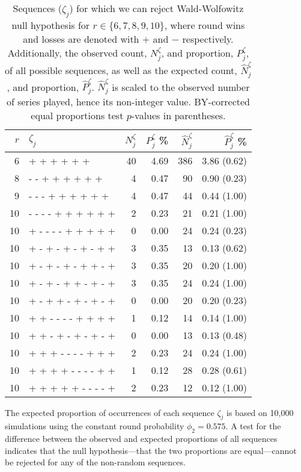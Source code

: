 \documentclass{article}
\begin{document}
\begin{table}

\caption{Sequences ($\zeta_j$) for which we can reject Wald-Wolfowitz null hypothesis for $r \in \{6, 7, 8, 9, 10\}$, where round wins and losses are denoted with $+$ and $-$ respectively. Additionally, the observed count, $N^{\zeta}_j$, and proportion, $P^{\zeta}_j$, of all possible sequences, as well as the expected count, $\hat{N}^{\zeta}_j$, and proportion, $\hat{P}^{\zeta}_j$. $\hat{N}^{\zeta}_j$ is scaled to the observed number of series played, hence its non-integer value. BY-corrected equal proportions test $p$-values in parentheses.}

\centering
\begin{tabular}{rlrrrr}
\toprule
$r$ & $\zeta_j$ & $N^{\zeta}_j$ & $P^{\zeta}_j$ \% & $\hat{N}^{\zeta}_j$ & $\hat{P}^{\zeta}_j$ \% \\ 
\midrule

6 & + + + + + + & 40 & 4.69 & 386 & 3.86 (0.62) \\ 
8 & - - + + + + + + & 4 & 0.47 & 90 & 0.90 (0.23) \\ 
9 & - - - + + + + + + & 4 & 0.47 & 44 & 0.44 (1.00) \\ 
10 & - - - - + + + + + + & 2 & 0.23 & 21 & 0.21 (1.00) \\ 
10 & + - - - - + + + + + & 0 & 0.00 & 24 & 0.24 (0.23) \\ 
10 & + - + - + - + - + + & 3 & 0.35 & 13 & 0.13 (0.62) \\ 
10 & + - + - + - + + - + & 3 & 0.35 & 20 & 0.20 (1.00) \\ 
10 & + - + - + + - + - + & 3 & 0.35 & 24 & 0.24 (1.00) \\ 
10 & + - + + - + - + - + & 0 & 0.00 & 20 & 0.20 (0.23) \\ 
10 & + + - - - - + + + + & 1 & 0.12 & 14 & 0.14 (1.00) \\ 
10 & + + - + - + - + - + & 0 & 0.00 & 13 & 0.13 (0.48) \\ 
10 & + + + - - - - + + + & 2 & 0.23 & 24 & 0.24 (1.00) \\ 
10 & + + + + - - - - + + & 1 & 0.12 & 28 & 0.28 (0.61) \\ 
10 & + + + + + - - - - + & 2 & 0.23 & 12 & 0.12 (1.00) \\ 

\bottomrule
\end{tabular}

\label{tbl:ww-sequences}
\end{table}

The expected proportion of occurrences of each sequence \(\zeta_j\) is
based on 10,000 simulations using the constant round probability
\(\phi_2 = 0.575\). A test for the difference between the observed and
expected proportions of all sequences indicates that the null
hypothesis---that the two proportions are equal---cannot be rejected for
any of the non-random sequences.
\end{document}
